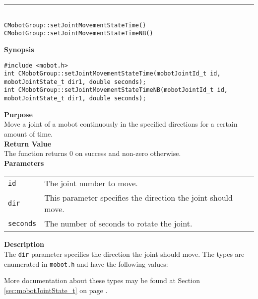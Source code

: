 \noindent
\vspace{5pt}
\rule{4.5in}{0.015in}\\
\noindent
{\LARGE \texttt{CMobotGroup::setJointMovementStateTime()}}\\
{\LARGE \texttt{CMobotGroup::setJointMovementStateTimeNB()}}\\
{}

\noindent
{\bf Synopsis}
\vspace{-8pt}
\begin{verbatim}
#include <mobot.h>
int CMobotGroup::setJointMovementStateTime(mobotJointId_t id, mobotJointState_t dir1, double seconds);
int CMobotGroup::setJointMovementStateTimeNB(mobotJointId_t id, mobotJointState_t dir1, double seconds);
\end{verbatim}

\noindent
{\bf Purpose}\\
Move a joint of a mobot continuously in the specified directions for a certain amount of time.\\

\noindent
{\bf Return Value}\\
The function returns 0 on success and non-zero otherwise.\\

\noindent
{\bf Parameters}\\
\vspace{-0.1in}
\begin{description}
\item               
\begin{tabular}{p{10 mm}p{145 mm}}
\texttt{id} & The joint number to move. \\
\texttt{dir} & This parameter specifies the direction the joint should move. \\
\texttt{seconds} & The number of seconds to rotate the joint. \\
\end{tabular}
\end{description}

\noindent
{\bf Description}\\
The \texttt{dir} parameter specifies the direction the joint should move.
The types
are enumerated in \texttt{mobot.h} and have the following values:

More documentation about these types may be found at Section
\ref{sec:mobotJointState_t} on page
\pageref{sec:mobotJointState_t}.  

